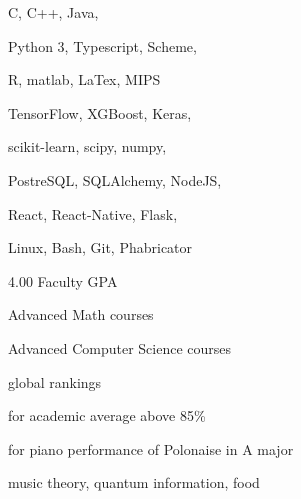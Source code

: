 C, C++, Java,
\smallskip

Python 3, Typescript, Scheme,
\smallskip

R, matlab, LaTex, MIPS

\divider\smallskip

TensorFlow, XGBoost, Keras,
\smallskip

scikit-learn, scipy, numpy,
\smallskip

PostreSQL, SQLAlchemy, NodeJS,
\smallskip

React, React-Native, Flask,

\divider\smallskip

Linux, Bash, Git, Phabricator



4.00 Faculty GPA

Advanced Math courses

Advanced Computer Science courses


global rankings

\divider\smallskip

for academic average above 85\%

\divider\smallskip

for piano performance of Polonaise in A major

music theory, quantum information, food

